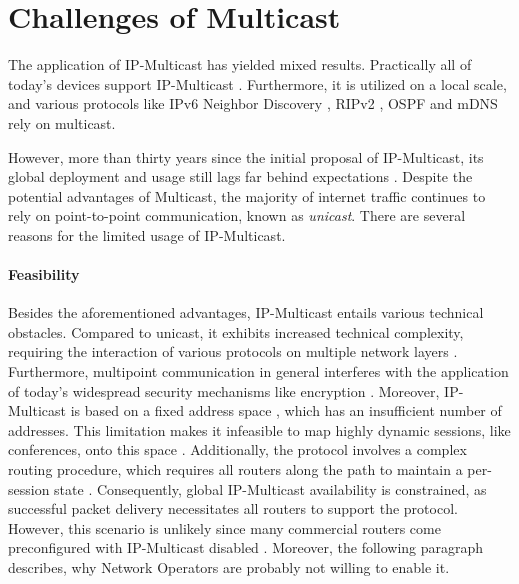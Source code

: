 \section{Challenges of Multicast} %
\label{sec:Challenges of Multicast}


The application of IP-Multicast has yielded mixed results.
Practically all of today's devices support IP-Multicast
    \cite{ratnasamy2006revisiting}.
Furthermore, it is utilized on a local scale, and various protocols like IPv6
    Neighbor Discovery \cite{rfc4861_ipv6_nd}, RIPv2 \cite{rfc2453_rip}, OSPF
    \cite{rfc2328_ospf} and mDNS \cite{rfc6762_mdns} rely on multicast.

However, more than thirty years since the initial proposal of IP-Multicast, its
    global deployment and usage still lags far behind expectations
    \cite{diot2000deployment, ratnasamy2006revisiting}.
Despite the potential advantages of Multicast, the majority of internet traffic
    continues to rely on point-to-point communication, known as
    \textit{unicast}.
There are several reasons for the limited usage of IP-Multicast.

\paragraph{Feasibility} %
\label{par:Feasibility}
Besides the aforementioned advantages, IP-Multicast entails various technical
    obstacles.
Compared to unicast, it exhibits increased technical complexity, requiring
    the interaction of various protocols on multiple network layers
    \cite{ratnasamy2006revisiting,diot2000deployment}.
Furthermore, multipoint communication in general interferes with the
    application of today's widespread security mechanisms like encryption
    \cite{rafaeli2003group_key_mgm}.
Moreover, IP-Multicast is based on a fixed address space \cite{rfc1112_ip4mc,
    rfc4291_ip6mc}, which has an insufficient number of addresses.
This limitation makes it infeasible to map highly dynamic sessions, like
    conferences, onto this space \cite{meadcast2}.
Additionally, the protocol involves a complex routing procedure, which requires
    all routers along the path to maintain a per-session state
    \cite{diot2000deployment, ratnasamy2006revisiting}.
Consequently, global IP-Multicast availability is constrained, as successful
    packet delivery necessitates all routers to support the protocol.
However, this scenario is unlikely since many commercial routers come
    preconfigured with IP-Multicast disabled \cite{aruba_doc}.
Moreover, the following paragraph describes, why Network Operators are probably
    not willing to enable it.

